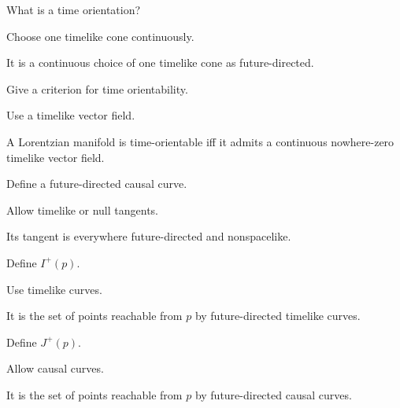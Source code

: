 \begin{exercise}\label{exr:vii30-07}
What is a time orientation?
\end{exercise}
\begin{hint}
Choose one timelike cone continuously.
\end{hint}
\begin{solution}
It is a continuous choice of one timelike cone as future-directed.
\end{solution}

\begin{exercise}\label{exr:vii30-08}
Give a criterion for time orientability.
\end{exercise}
\begin{hint}
Use a timelike vector field.
\end{hint}
\begin{solution}
A Lorentzian manifold is time-orientable iff it admits a continuous nowhere-zero timelike vector field.
\end{solution}

\begin{exercise}\label{exr:vii30-09}
Define a future-directed causal curve.
\end{exercise}
\begin{hint}
Allow timelike or null tangents.
\end{hint}
\begin{solution}
Its tangent is everywhere future-directed and nonspacelike.
\end{solution}

\begin{exercise}\label{exr:vii30-10}
Define \(I^+(p)\).
\end{exercise}
\begin{hint}
Use timelike curves.
\end{hint}
\begin{solution}
It is the set of points reachable from \(p\) by future-directed timelike curves.
\end{solution}

\begin{exercise}\label{exr:vii30-11}
Define \(J^+(p)\).
\end{exercise}
\begin{hint}
Allow causal curves.
\end{hint}
\begin{solution}
It is the set of points reachable from \(p\) by future-directed causal curves.
\end{solution}

